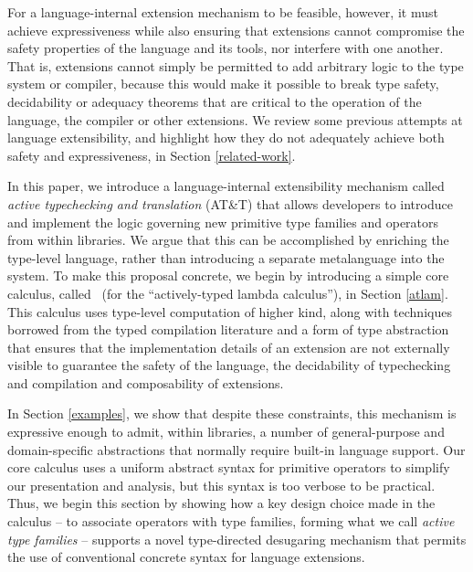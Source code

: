 \documentclass{llncs}
\begin{document}

For a language-internal extension mechanism to be feasible, however, it must achieve expressiveness while also ensuring that extensions cannot compromise the safety properties of the language and its tools, nor interfere with one another. That is, extensions cannot simply be permitted to add arbitrary logic to the type system or compiler, because this would make it possible to break  type safety, decidability or adequacy theorems that are critical to the operation of the language, the compiler or other extensions. We review some previous attempts at language extensibility, and highlight how they do not adequately achieve both safety and expressiveness, in Section \ref{related-work}.

In this paper, we introduce a language-internal extensibility mechanism called \emph{active typechecking and translation} (AT\&T) that allows developers to introduce and implement the logic governing new primitive type families and operators from within libraries. 
We argue that this can be accomplished by enriching the type-level language, rather than introducing a separate metalanguage into the system. 
To make this proposal concrete, we begin by introducing a simple core calculus, called \atlam~(for the ``actively-typed lambda calculus''), in Section \ref{atlam}. 
This calculus uses type-level computation of higher kind, along with techniques borrowed from the typed compilation literature and a form of type abstraction that ensures that the implementation details of an extension are not externally visible to guarantee the safety of the language, the decidability of typechecking and compilation and composability of extensions.

In Section \ref{examples}, we show that despite these constraints, this mechanism is expressive enough to admit, within libraries, a number of general-purpose and domain-specific abstractions that normally require built-in language support. Our core calculus uses a uniform abstract syntax for primitive operators to simplify our presentation and analysis, but this syntax is too verbose to be practical. Thus, we begin this section by showing how a key design choice made in the calculus -- to associate operators with type families, forming what we call \emph{active type families} -- supports a novel type-directed desugaring mechanism that permits the use of conventional concrete syntax for language extensions. 
\end{document}
